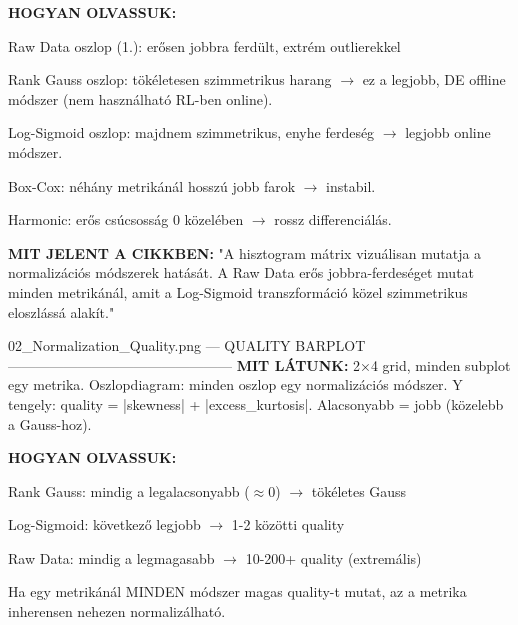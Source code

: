 \documentclass[11pt,a4paper]{article}
\begin{document}
\textbf{HOGYAN OLVASSUK:}
\par\noindent\hspace*{1em}\textbullet{} Raw Data oszlop (1.): erősen jobbra ferdült, extrém outlierekkel
\par\noindent\hspace*{1em}\textbullet{} Rank Gauss oszlop: tökéletesen szimmetrikus harang $\rightarrow$ ez a legjobb,
DE offline módszer (nem használható RL-ben online).
\par\noindent\hspace*{1em}\textbullet{} Log-Sigmoid oszlop: majdnem szimmetrikus, enyhe ferdeség $\rightarrow$ legjobb
online módszer.
\par\noindent\hspace*{1em}\textbullet{} Box-Cox: néhány metrikánál hosszú jobb farok $\rightarrow$ instabil.
\par\noindent\hspace*{1em}\textbullet{} Harmonic: erős csúcsosság 0 közelében $\rightarrow$ rossz differenciálás.

\textbf{MIT JELENT A CIKKBEN:}
"A hisztogram mátrix vizuálisan mutatja a normalizációs módszerek
hatását. A Raw Data erős jobbra-ferdeséget mutat minden metrikánál,
amit a Log-Sigmoid transzformáció közel szimmetrikus eloszlássá alakít."

02\_Normalization\_Quality.png — QUALITY BARPLOT
------------------------------------------------
\textbf{MIT LÁTUNK:}
2×4 grid, minden subplot egy metrika.
Oszlopdiagram: minden oszlop egy normalizációs módszer.
Y tengely: quality = |skewness| + |excess\_kurtosis|.
Alacsonyabb = jobb (közelebb a Gauss-hoz).

\textbf{HOGYAN OLVASSUK:}
\par\noindent\hspace*{1em}\textbullet{} Rank Gauss: mindig a legalacsonyabb ($\approx$0) $\rightarrow$ tökéletes Gauss
\par\noindent\hspace*{1em}\textbullet{} Log-Sigmoid: következő legjobb $\rightarrow$ 1-2 közötti quality
\par\noindent\hspace*{1em}\textbullet{} Raw Data: mindig a legmagasabb $\rightarrow$ 10-200+ quality (extremális)
\par\noindent\hspace*{1em}\textbullet{} Ha egy metrikánál MINDEN módszer magas quality-t mutat,
az a metrika inherensen nehezen normalizálható.
\end{document}
